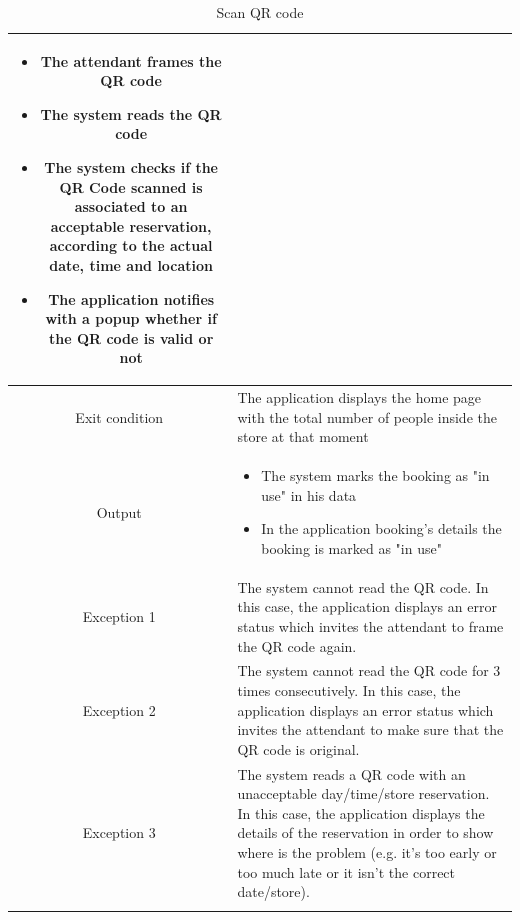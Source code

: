 \documentclass[table, 12pt]{article}
\begin{document}
\begin{longtable}{|c| p{10cm}|}
\begin{itemize}[nosep,after=\strut]
        \item The attendant frames the QR code
        \item The system reads the QR code
        \item The system checks if the QR Code scanned is associated to an acceptable reservation, according to the actual date, time and location
        \item The application notifies with a popup whether if the QR code is valid or not
    \end{itemize}                                                                                                                                                                                                                                         \\
    \hline
    Exit condition   & The application displays the home page with the total number of people inside the store at that moment                                                                                                                                                             \\ \hline
    Output           & \begin{itemize}
        \item The system marks the booking as "in use" in his data
        \item In the application booking's details the booking is marked as "in use"
    \end{itemize}
    \\
    \hline
    \hline
    Exception 1      & The system cannot read the QR code. In this case, the application displays an error status which invites the attendant to frame the QR code again.                                                                                                                 \\
    \hline
    Exception 2      & The system cannot read the QR code for 3 times consecutively. In this case, the application displays an error status which invites the attendant to make sure that the QR code is original.                                                                        \\
    \hline
    Exception 3      & The system reads a QR code with an unacceptable day/time/store reservation. In this case, the application displays the details of the reservation in order to show where is the problem (e.g. it's too early or too much late or it isn't the correct date/store). \\
    \hline
    \caption{Scan QR code}                                                                                                                                                                                                                                                                \\
\end{longtable}
\end{document}
